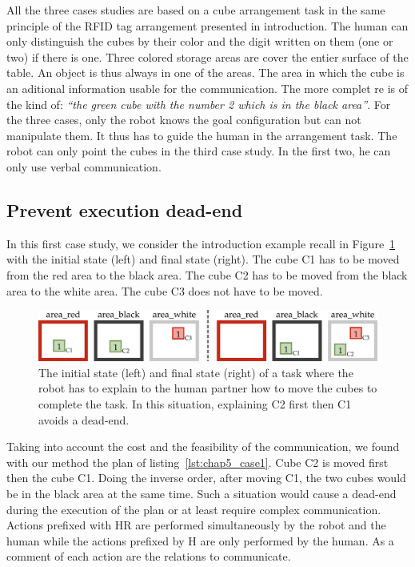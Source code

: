 All the three cases studies are based on a cube arrangement task in the same principle of the RFID tag arrangement presented in introduction. The human can only distinguish the cubes by their color and the digit written on them (one or two) if there is one. Three colored storage areas are cover the entier surface of the table. An object is thus always in one of the areas. The area in which the cube is an aditional information usable for the communication. The more complet \acrshort{re} is of the kind of: \textit{``the green cube with the number 2 which is in the black area''}. For the three cases, only the robot knows the goal configuration but can not manipulate them. It thus has to guide the human in the arrangement task. The robot can only point the cubes in the third case study. In the first two, he can only use verbal communication.

\subsection{Prevent execution dead-end}

In this first case study, we consider the introduction example recall in Figure~\ref{fig:chap5_case1} with the initial state (left) and final state (right). The cube C1 has to be moved from the red area to the black area. The cube C2 has to be moved from the black area to the white area. The cube C3 does not have to be moved.

\begin{figure}[!ht]
\centering
\includegraphics[width=\textwidth]{figures/chapter5/results_case1.png}
\caption{\label{fig:chap5_case1} The initial state (left) and final state (right) of a task where the robot has to explain to the human partner how to move the cubes to complete the task. In this situation, explaining C2 first then C1 avoids a dead-end. }
\end{figure}

Taking into account the cost and the feasibility of the communication, we found with our method the plan of listing~\ref{lst:chap5_case1}. Cube C2 is moved first then the cube C1. Doing the inverse order, after moving C1, the two cubes would be in the black area at the same time. Such a situation would cause a dead-end during the execution of the plan or at least require complex communication. Actions prefixed with HR are performed simultaneously by the robot and the human while the actions prefixed by H are only performed by the human. As a comment of each action are the relations to communicate.

